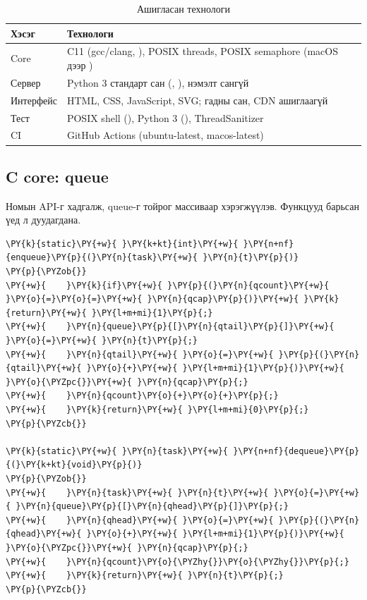 \documentclass[12pt,a4paper]{article}
\begin{document}
\begin{table}[H]
\centering
\caption{Ашигласан технологи}\label{tab:tech}
\begin{tabular}{|P{0.220}|P{0.780}|}
\hline
{} \textbf{Хэсэг} & \textbf{Технологи} \\ \hline
Core & C11 (gcc/clang, ), POSIX threads, POSIX semaphore (macOS дээр ) \\ \hline
Сервер & Python 3 стандарт сан (, ), нэмэлт сангүй \\ \hline
Интерфейс & HTML, CSS, JavaScript, SVG; гадны сан, CDN ашиглаагүй \\ \hline
Тест & POSIX shell (), Python 3 (), ThreadSanitizer \\ \hline
CI & GitHub Actions (ubuntu-latest, macos-latest) \\ \hline
\end{tabular}
\end{table}

\subsection{C core: queue}

Номын API-г хадгалж, queue-г тойрог массиваар хэрэгжүүлэв. Функцууд  барьсан үед л дуудагдана.

\par\noindent\begin{minipage}{\linewidth}\setlength{\topsep}{1pt}\setlength{\partopsep}{0pt}
\label{lst:queue}
\begin{Verbatim}[commandchars=\\\{\}]
\PY{k}{static}\PY{+w}{ }\PY{k+kt}{int}\PY{+w}{ }\PY{n+nf}{enqueue}\PY{p}{(}\PY{n}{task}\PY{+w}{ }\PY{n}{t}\PY{p}{)}
\PY{p}{\PYZob{}}
\PY{+w}{    }\PY{k}{if}\PY{+w}{ }\PY{p}{(}\PY{n}{qcount}\PY{+w}{ }\PY{o}{=}\PY{o}{=}\PY{+w}{ }\PY{n}{qcap}\PY{p}{)}\PY{+w}{ }\PY{k}{return}\PY{+w}{ }\PY{l+m+mi}{1}\PY{p}{;}
\PY{+w}{    }\PY{n}{queue}\PY{p}{[}\PY{n}{qtail}\PY{p}{]}\PY{+w}{ }\PY{o}{=}\PY{+w}{ }\PY{n}{t}\PY{p}{;}
\PY{+w}{    }\PY{n}{qtail}\PY{+w}{ }\PY{o}{=}\PY{+w}{ }\PY{p}{(}\PY{n}{qtail}\PY{+w}{ }\PY{o}{+}\PY{+w}{ }\PY{l+m+mi}{1}\PY{p}{)}\PY{+w}{ }\PY{o}{\PYZpc{}}\PY{+w}{ }\PY{n}{qcap}\PY{p}{;}
\PY{+w}{    }\PY{n}{qcount}\PY{o}{+}\PY{o}{+}\PY{p}{;}
\PY{+w}{    }\PY{k}{return}\PY{+w}{ }\PY{l+m+mi}{0}\PY{p}{;}
\PY{p}{\PYZcb{}}

\PY{k}{static}\PY{+w}{ }\PY{n}{task}\PY{+w}{ }\PY{n+nf}{dequeue}\PY{p}{(}\PY{k+kt}{void}\PY{p}{)}
\PY{p}{\PYZob{}}
\PY{+w}{    }\PY{n}{task}\PY{+w}{ }\PY{n}{t}\PY{+w}{ }\PY{o}{=}\PY{+w}{ }\PY{n}{queue}\PY{p}{[}\PY{n}{qhead}\PY{p}{]}\PY{p}{;}
\PY{+w}{    }\PY{n}{qhead}\PY{+w}{ }\PY{o}{=}\PY{+w}{ }\PY{p}{(}\PY{n}{qhead}\PY{+w}{ }\PY{o}{+}\PY{+w}{ }\PY{l+m+mi}{1}\PY{p}{)}\PY{+w}{ }\PY{o}{\PYZpc{}}\PY{+w}{ }\PY{n}{qcap}\PY{p}{;}
\PY{+w}{    }\PY{n}{qcount}\PY{o}{\PYZhy{}}\PY{o}{\PYZhy{}}\PY{p}{;}
\PY{+w}{    }\PY{k}{return}\PY{+w}{ }\PY{n}{t}\PY{p}{;}
\PY{p}{\PYZcb{}}
\end{Verbatim}
\end{minipage}
\end{document}
